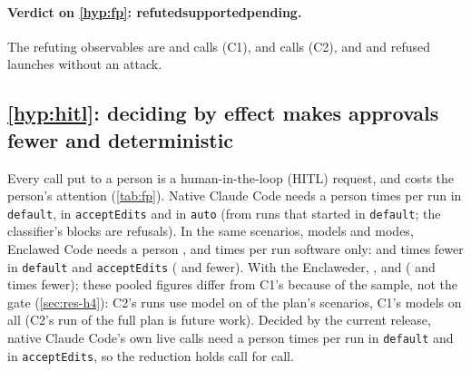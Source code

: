 \documentclass[11pt]{article}
\newcommand{\dev}{Enclaweder}
\newcommand{\cz}{Enclawed Code}
\newcommand{\czVerdict}[1]{\textbf{\ifcase#1 refuted\or supported\or pending\fi}}
\newcommand{\VerdictHtwo}{\czVerdict{\HtwoCode}}
\begin{document}
\begin{table}[!htbp]
\centering\footnotesize
\caption{Refinement curve: the decisions on the same \RefCalls{} C1
live calls (and C2's \RefCTwoCalls{} where that commit decides them) at
successive kit commits of enclawed-oss on 2026-11-23 (commit time,
UTC$-$8), against one fixed set of labels. Rows: the commits that change
a count, and two later ones; the \RefUnchanged{} commits in between that
change none are in \texttt{data/refinement-curve.json}. --: not decided
at that commit.}
\label{tab:refine}

\end{table}

\paragraph{Verdict on \ref{hyp:fp}: \VerdictHtwo{}.} The refuting
observables are \CzOneFPHarmless{} and \CzOneFPConsequential{} calls
(C1), \CzTwoFPHarmless{} and \CzTwoFPConsequential{} calls (C2), and
\LaunchCOneFP{} and \LaunchCTwoFP{} refused launches without an attack.

\subsection{\ref{hyp:hitl}: deciding by effect makes approvals fewer and deterministic}
\label{sec:res-h3}

Every call put to a person is a human-in-the-loop (HITL) request, and
costs the person's attention (\cref{tab:fp}). Native Claude Code needs a
person \NativeDefaultNeedPerRun{} times per run in \texttt{default},
\NativeAcceptEditsNeedPerRun{} in \texttt{acceptEdits} and
\NativeAutoNeedPerRun{} in \texttt{auto} (from runs that started in
\texttt{default}; the classifier's \NativeAutoRefusedClassifier{} blocks
are refusals). In the same scenarios, models and modes, \cz{} needs a
person \CzOneDefaultNeedPerRun{}, \CzOneAcceptEditsNeedPerRun{} and
\CzOneAutoNeedPerRun{} times per run software only:
\CzOneHitlFactorDefault{} and \CzOneHitlFactorAcceptEdits{} times fewer
in \texttt{default} and \texttt{acceptEdits} (\CzOneHitlCutDefault{} and
\CzOneHitlCutAcceptEdits{} fewer). With the \dev{}, \CzTwoDefaultNeedPerRun{},
\CzTwoAcceptEditsNeedPerRun{} and \CzTwoAutoNeedPerRun{}
(\CzTwoHitlFactorDefault{} and \CzTwoHitlFactorAcceptEdits{} times
fewer); these pooled figures differ from C1's because of the sample, not
the gate (\cref{sec:res-h4}): C2's \CzTwoReplayedRuns{} runs use
\CzTwoModelCount{} model on \CzTwoScenarioCount{} of the plan's
scenarios, C1's \CzOneModelCount{} models on all \CzOneScenarioCount{}
(C2's run of the full plan is future work). Decided by the
current release, native Claude Code's own live calls need a person
\ReplayNativeDefaultNeedPerRun{} times per run in \texttt{default} and
\ReplayNativeAcceptEditsNeedPerRun{} in \texttt{acceptEdits}, so the
reduction holds call for call.
\end{document}
